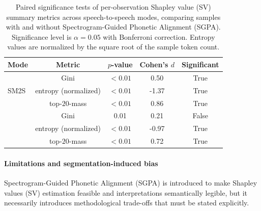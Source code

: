 \begin{table}[t!]
\centering
\caption{Paired significance tests of per-observation Shapley value (SV) summary metrics across speech-to-speech modes, comparing samples with and without Spectrogram-Guided Phonetic Alignment (SGPA). Significance level is $\alpha = 0.05$ with Bonferroni correction. Entropy values are normalized by the square root of the sample token count.}
\begin{tabular}{lcccc}
\toprule
\textbf{Mode} & \textbf{Metric} & \textbf{$p$-value} & \textbf{Cohen's $d$} & \textbf{Significant} \\
\midrule
\multirow{3}{*}{SM2S} & Gini                  & $< 0.01$ & 0.50  & True \\
                       & entropy (normalized)  & $< 0.01$ & -1.37 & True \\
                       & top-$20$-mass         & $< 0.01$ & 0.86  & True \\
\addlinespace
\multirow{3}{*}{SF2S} & Gini                  & 0.01      & 0.21  & False \\
                       & entropy (normalized)  & $< 0.01$ & -0.97 & True \\
                       & top-$20$-mass         & $< 0.01$ & 0.72  & True \\
\bottomrule
\end{tabular}
\label{tab:experiments__sgpa__ttest}
\end{table}

\paragraph{Limitations and segmentation-induced bias}

Spectrogram-Guided Phonetic Alignment (SGPA) is introduced to make Shapley values (SV) estimation feasible and interpretations semantically legible, but it necessarily introduces methodological trade-offs that must be stated explicitly.

